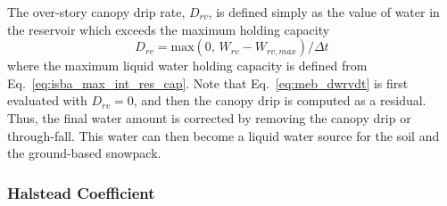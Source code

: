 %
The over-story 
canopy drip rate, $D_{rv}$, 
is defined simply as the value of water in the reservoir which exceeds the maximum holding capacity
%
\begin{equation}
\label{Drv_can_drip}
D_{rv} = {\mathrm{max}}\left( 0, \, W_{rv} - W_{rv,max}\right)/\Delta t
\end{equation}
%
where the maximum liquid water holding capacity is defined 
from Eq.~\ref{eq:isba_max_int_res_cap}.
%
%
%
%
%
Note that Eq.~\ref{eq:meb_dwrvdt} is first evaluated with $D_{rv}=0$, 
and then the canopy drip is computed as a residual.
Thus, the final water amount is corrected
by removing the canopy drip or through-fall.
This water can then become a liquid water source for the soil and the 
ground-based snowpack.

\subsubsection{Halstead Coefficient}
\label{sec:meb_halstead} 

